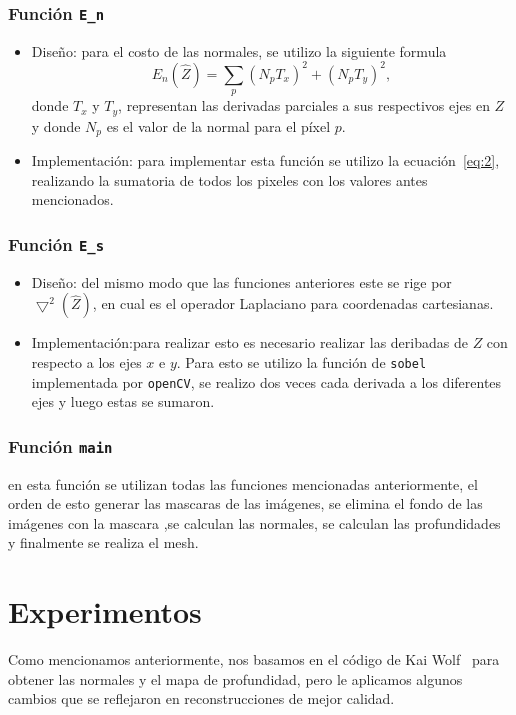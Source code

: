 \documentclass[twocolumn,11pts]{IEEEtran}
\begin{document}
\subsubsection{Función \texttt{E\_n}}
\begin{itemize}
\item Diseño: para el costo de las normales, se utilizo la siguiente formula
\begin{equation} \label{eq:2}
E_n(\hat{Z})= \sum_{p} (N_p T_x)^2 + (N_p T_y)^2,
\end{equation}
donde $T_x$ y $T_y$, representan las derivadas parciales a sus respectivos ejes en $Z$ y donde $N_p$  es el valor de la normal para el píxel $p$.
\item Implementación: para implementar esta función se utilizo la ecuación~\ref{eq:2}, realizando la sumatoria de todos los pixeles con los valores antes mencionados.
\end{itemize}
\subsubsection{Función \texttt{E\_s}}
\begin{itemize}
\item Diseño: del mismo modo que las funciones anteriores este se rige por $\bigtriangledown^2(\hat{Z})$, en cual es el operador Laplaciano para coordenadas cartesianas.
\item Implementación:para realizar esto es necesario realizar las deribadas de $Z$ con respecto a los ejes $x$ e $y$. Para esto se utilizo la función de \texttt{sobel} implementada por \texttt{openCV}, se realizo dos veces cada derivada a los diferentes ejes y luego estas se sumaron.
\end{itemize}
\subsubsection{Función \texttt{main}}
en esta función se utilizan todas las funciones mencionadas anteriormente, el orden de esto generar las mascaras de las imágenes, se elimina el fondo de las imágenes con la mascara ,se calculan las normales, se calculan las profundidades y finalmente se realiza el mesh.


\section{Experimentos}
Como mencionamos anteriormente, nos basamos en el código de Kai Wolf~\cite{repo} para obtener las normales y el mapa de profundidad, pero le aplicamos algunos cambios que se reflejaron en reconstrucciones de mejor calidad. 
\end{document}
